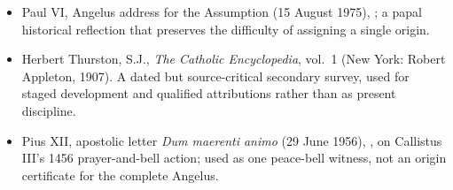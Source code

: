 \begin{itemize}
  \item Paul VI, Angelus address for the Assumption (15 August 1975), ; a papal historical reflection that preserves the difficulty of assigning a single origin.
  \item Herbert Thurston, S.J.,  \textit{The Catholic Encyclopedia}, vol.~1 (New York: Robert Appleton, 1907). A dated but source-critical secondary survey, used for staged development and qualified attributions rather than as present discipline.
  \item Pius XII, apostolic letter \textit{Dum maerenti animo} (29 June 1956), , on Callistus III's 1456 prayer-and-bell action; used as one peace-bell witness, not an origin certificate for the complete Angelus.
\end{itemize}
